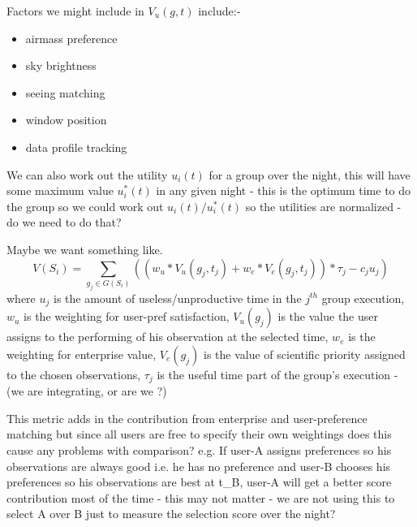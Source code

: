 \begin{enumerate}
Factors we might include in $V_u(g,t)$ include:-
\begin{itemize}
\item airmass preference
\item sky brightness
\item seeing matching
\item window position
\item data profile tracking
\end{itemize}

\end{enumerate}

We can also work out the utility $u_i(t)$ for a group over the night, this will have some maximum value $u^*_i(t)$ in any given night - this is the optimum time to do the group so we could work out $u_i(t)/u^*_i(t)$ so the utilities are normalized - do we need to do that?

Maybe we want something like.
\begin{equation}
V(S_i) = \mathop{\sum}_{g_j \in G(S_i)} ((w_{u}*V_{u}(g_j,t_j) + w_{e}*V_{e}(g_j,t_j))*\tau_j - c_j u_j) 
\end{equation} 
where $u_j$ is the amount of useless/unproductive time in the $j^{th}$ group execution, $w_{u}$ is the weighting for user-pref satisfaction, $V_{u}(g_j)$ is the value the user assigns to the performing of his observation at the selected time, $w_{e}$ is the weighting for enterprise value, $V_{e}(g_j)$ is the value of scientific priority assigned to the chosen observations, $\tau_j$ is the useful time part of the group's execution - (we are integrating, or are we ?)

This metric adds in the contribution from enterprise and user-preference matching but since all users are free to specify their own weightings does this cause any problems with comparison? e.g. If user-A assigns preferences so his observations are always good i.e. he has no preference and user-B chooses his preferences so his observations are best at t\_B, user-A will get a better score contribution most of the time - this may not matter - we are not using this to select A over B just to measure the selection score over the night?


